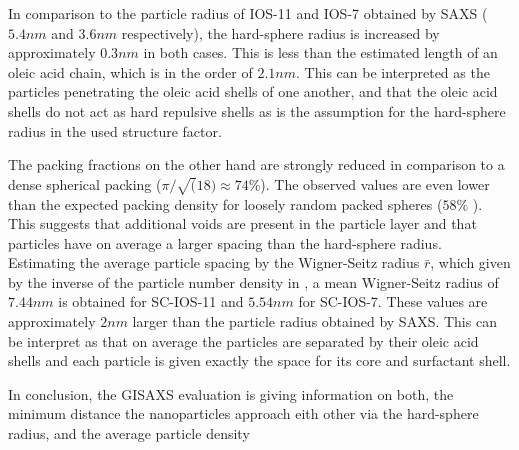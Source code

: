 \documentclass[\main/dresen_thesis.tex]{subfiles}
\begin{document}
  In comparison to the particle radius of IOS-11 and IOS-7 obtained by SAXS ($5.4 \unit{nm}$ and $3.6 \unit{nm}$ respectively), the hard-sphere radius is increased by approximately $0.3 \unit{nm}$ in both cases.
  This is less than the estimated length of an oleic acid chain, which is in the order of $2.1 \unit{nm}$.
  This can be interpreted as the particles penetrating the oleic acid shells of one another, and that the oleic acid shells do not act as hard repulsive shells as is the assumption for the hard-sphere radius in the used structure factor.

  The packing fractions on the other hand are strongly reduced in comparison to a dense spherical packing ($\pi / \sqrt(18) \approx 74 \%$).
  The observed values are even lower than the expected packing density for loosely random packed spheres ($58 \%$ \cite{Tory_1973_Simul, Shi_2008_Simul}).
  This suggests that additional voids are present in the particle layer and that particles have on average a larger spacing than the hard-sphere radius.
  Estimating the average particle spacing by the Wigner-Seitz radius $\bar{r}$, which given by the inverse of the particle number density in , a mean Wigner-Seitz radius of $7.44 \unit{nm}$ is obtained for SC-IOS-11 and $5.54 \unit{nm}$ for SC-IOS-7.
  These values are approximately $2 \unit{nm}$ larger than the particle radius obtained by SAXS.
  This can be interpret as that on average the particles are separated by their oleic acid shells and each particle is given exactly the space for its core and surfactant shell.

  In conclusion, the GISAXS evaluation is giving information on both, the minimum distance the nanoparticles approach eith other via the hard-sphere radius, and the average particle density 
\end{document}
